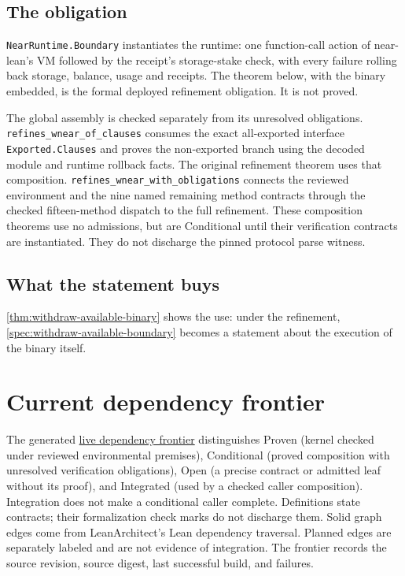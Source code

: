 
\section{The obligation}

\texttt{NearRuntime.Boundary} instantiates the runtime: one function-call
action of near-lean's VM followed by the receipt's storage-stake check, with
every failure rolling back storage, balance, usage and receipts. The theorem
below, with the binary embedded, is the formal deployed refinement
obligation. It is not proved.

The global assembly is checked separately from its unresolved obligations.
\texttt{refines\_wnear\_of\_clauses} consumes the exact all-exported interface
\texttt{Exported.Clauses} and proves the non-exported branch using the decoded
module and runtime rollback facts. The original refinement theorem uses that
composition. \texttt{refines\_wnear\_with\_obligations} connects the reviewed
environment and the nine named remaining method contracts through the checked
fifteen-method dispatch to the full refinement. These composition theorems use
no admissions, but are Conditional until their verification contracts are
instantiated. They do not discharge the pinned protocol parse witness.


\section{What the statement buys}

\cref{thm:withdraw-available-binary} shows the use: under the refinement,
\cref{spec:withdraw-available-boundary} becomes a statement about the
execution of the binary itself.


\chapter{Current dependency frontier}
\label{ch:frontier}

The generated \href{frontier.html}{live dependency frontier} distinguishes
Proven (kernel checked under reviewed environmental premises), Conditional
(proved composition with unresolved verification obligations), Open (a precise
contract or admitted leaf without its proof), and Integrated (used by a checked
caller composition). Integration does not make a conditional caller complete.
Definitions state contracts; their formalization check marks do not discharge them.
Solid graph edges come from LeanArchitect's Lean dependency traversal. Planned
edges are separately labeled and are not evidence of integration. The frontier
records the source revision, source digest, last successful build, and failures.

